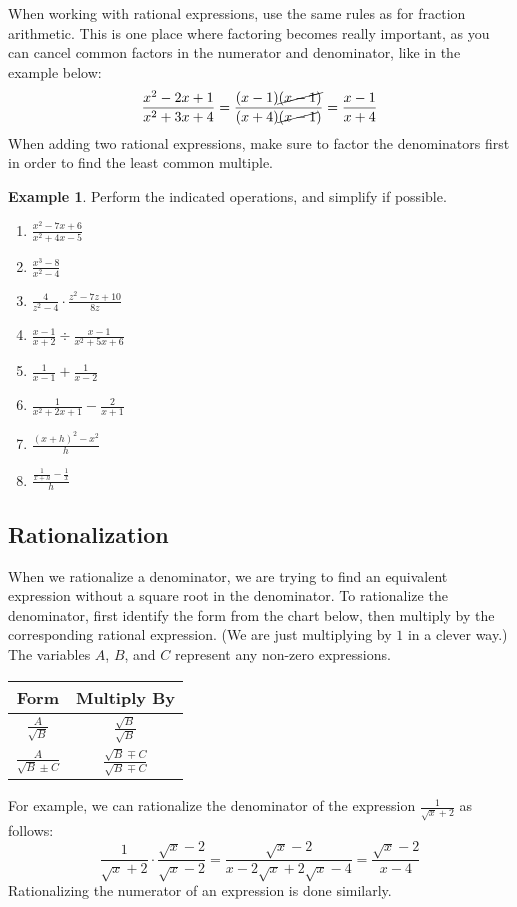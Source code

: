 \documentclass[letterpaper,12pt,oneside]{book}
\def\arraystretch{1.2}
\theoremstyle{definition}
\newtheorem{example}[theorem]{Example}
\begin{document}
When working with rational expressions, use the same rules as for fraction arithmetic.  This is one place where factoring becomes really important, as you can cancel common factors in the numerator and denominator, like in the example below:
\[
\frac{x^2-2x+1}{x^2+3x+4}=\frac{(x-1)\cancel{(x-1)}}{(x+4)\cancel{(x-1})}=\frac{x-1}{x+4}
\]
When adding two rational expressions, make sure to factor the denominators first in order to find the least common multiple.

\begin{example}
Perform the indicated operations, and simplify if possible.
\begin{enumerate}
\item $\displaystyle\frac{x^2-7x+6}{x^2+4x-5}$
\vfill
\item $\displaystyle\frac{x^3-8}{x^2-4}$
\vfill
\item $\displaystyle\frac{4}{z^2-4}\cdot \frac{z^2-7z+10}{8z}$
\vfill
\item $\displaystyle\frac{x-1}{x+2}\div \frac{x-1}{x^2+5x+6}$
\vfill

\newpage

\item $\displaystyle\frac{1}{x-1}+\frac{1}{x-2}$
\vfill
\item $\displaystyle\frac{1}{x^2+2x+1}-\frac{2}{x+1}$
\vfill
\item $\displaystyle\frac{(x+h)^2-x^2}{h}$
\vfill
\item $\displaystyle\frac{\frac{1}{x+h}-\frac{1}{x}}{h}$
\vfill
\end{enumerate}
\end{example}

\newpage

\subsection*{Rationalization}

When we rationalize a denominator, we are trying to find an equivalent expression without a square root in the denominator. To rationalize the denominator, first identify the form from the chart below, then multiply by the corresponding rational expression.  (We are just multiplying by $1$ in a clever way.)  The variables $A$, $B$, and $C$ represent any non-zero expressions.

\begin{center}
\def\arraystretch{2}
\begin{tabular}{c | c}
Form & Multiply By\\\hline
$\displaystyle\frac{A}{\sqrt{B}}$ & $\displaystyle\frac{\sqrt{B}}{\sqrt{B}}$\\[15pt]
$\displaystyle\frac{A}{\sqrt{B}\pm C}$ & $\displaystyle\frac{\sqrt{B}\mp C}{\sqrt{B}\mp C}$
\end{tabular}
\end{center}
For example, we can rationalize the denominator of the expression $\displaystyle\frac{1}{\sqrt{x}+2}$ as follows:
\[
\frac{1}{\sqrt{x}+2}\cdot \frac{\sqrt{x}-2}{\sqrt{x}-2}=\frac{\sqrt{x}-2}{x-2\sqrt{x}+2\sqrt{x}-4}=\frac{\sqrt{x}-2}{x-4}
\]
Rationalizing the numerator of an expression is done similarly.
\end{document}
